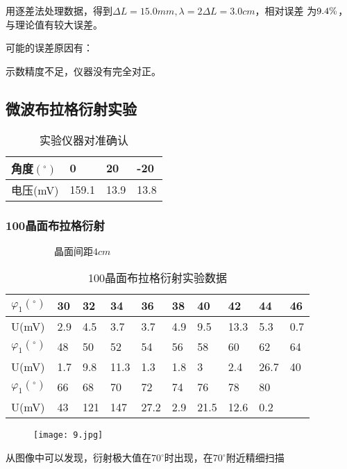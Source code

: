 \documentclass[12pt,a4paper]{article}
\begin{document}
    用逐差法处理数据，得到$\Delta L = 15.0mm,\lambda  = 2\Delta L = 3.0cm$，相对误差
    为$9.4{\rm{\% }}$，与理论值有较大误差。\par
    可能的误差原因有：\par
    示数精度不足，仪器没有完全对正。

\subsection{微波布拉格衍射实验}
    \begin{table}[H]
        \centering
        \caption{实验仪器对准确认}
        \begin{tabular}{|l|l|l|l|}
        \hline
            角度$(^{\circ})$ & 0 & 20 & -20 \\ \hline
            电压(mV) & 159.1 & 13.9 & 13.8 \\ \hline
        \end{tabular}
    \end{table}

    \subsubsection{100晶面布拉格衍射}
        \begin{table}[H]
            \centering
            \caption{100晶面布拉格衍射实验数据}
            \raggedright{$\qquad\qquad\quad$晶面间距$4cm$\par}
            \centering
            \begin{tabular}{|l|l|l|l|l|l|l|l|l|l|}
            \hline
                $\varphi_1(^\circ)$ & 30 & 32 & 34 & 36 & 38 & 40 & 42 & 44 & 46 \\ \hline
                U(mV) & 2.9 & 4.5 & 3.7 & 3.7 & 4.9 & 9.5 & 13.3 & 5.3 & 0.7 \\ \hline
                $\varphi_1(^\circ)$ & 48 & 50 & 52 & 54 & 56 & 58 & 60 & 62 & 64 \\ \hline
                U(mV) & 1.7 & 9.8 & 11.3 & 1.3 & 1.8 & 3 & 2.4 & 26.7 & 40 \\ \hline
                $\varphi_1(^\circ)$ & 66 & 68 & 70 & 72 & 74 & 76 & 78 & 80 & ~ \\ \hline
                U(mV) & 43 & 121& 147 & 27.2 & 2.9& 21.5 & 12.6 & 0.2 & ~ \\ \hline
            \end{tabular}
        \end{table}
\begin{figure}
    \centering
    \texttt{[image: 9.jpg]}
\end{figure}
        从图像中可以发现，衍射极大值在$70^{\circ}$时出现，在$70^{\circ}$附近精细扫描
\end{document}
